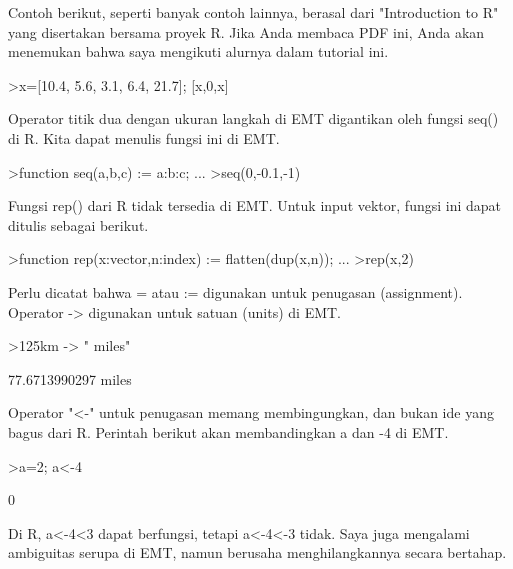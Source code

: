 \documentclass{article}
\newenvironment{eulernotebook}{\par}{\par}
\newenvironment{eulercomment}{\par\medskip}{\par\medskip}
\begin{document}
\begin{eulernotebook}
\begin{eulercomment}
\begin{eulercomment}
\begin{eulercomment}
\begin{eulercomment}
\begin{eulercomment}
Contoh berikut, seperti banyak contoh lainnya, berasal dari
"Introduction to R" yang disertakan bersama proyek R. Jika Anda
membaca PDF ini, Anda akan menemukan bahwa saya mengikuti alurnya
dalam tutorial ini.
\end{eulercomment}
\begin{eulerprompt}
>x=[10.4, 5.6, 3.1, 6.4, 21.7]; [x,0,x]
\end{eulerprompt}
\begin{euleroutput}
  [10.4,  5.6,  3.1,  6.4,  21.7,  0,  10.4,  5.6,  3.1,  6.4,  21.7]
\end{euleroutput}
\begin{eulercomment}
Operator titik dua dengan ukuran langkah di EMT digantikan oleh fungsi
seq() di R. Kita dapat menulis fungsi ini di EMT.
\end{eulercomment}
\begin{eulerprompt}
>function seq(a,b,c) := a:b:c; ...
>seq(0,-0.1,-1)
\end{eulerprompt}
\begin{euleroutput}
  [0,  -0.1,  -0.2,  -0.3,  -0.4,  -0.5,  -0.6,  -0.7,  -0.8,  -0.9,  -1]
\end{euleroutput}
\begin{eulercomment}
Fungsi rep() dari R tidak tersedia di EMT. Untuk input vektor, fungsi
ini dapat ditulis sebagai berikut.
\end{eulercomment}
\begin{eulerprompt}
>function rep(x:vector,n:index) := flatten(dup(x,n)); ...
>rep(x,2)
\end{eulerprompt}
\begin{euleroutput}
  [10.4,  5.6,  3.1,  6.4,  21.7,  10.4,  5.6,  3.1,  6.4,  21.7]
\end{euleroutput}
\begin{eulercomment}
Perlu dicatat bahwa = atau := digunakan untuk penugasan (assignment).
Operator -\textgreater{} digunakan untuk satuan (units) di EMT.
\end{eulercomment}
\begin{eulerprompt}
>125km -> " miles"
\end{eulerprompt}
\begin{euleroutput}
  77.6713990297 miles
\end{euleroutput}
\begin{eulercomment}
Operator "\textless{}-" untuk penugasan memang membingungkan, dan bukan ide yang
bagus dari R. Perintah berikut akan membandingkan a dan -4 di EMT.
\end{eulercomment}
\begin{eulerprompt}
>a=2; a<-4
\end{eulerprompt}
\begin{euleroutput}
  0
\end{euleroutput}
\begin{eulercomment}
Di R, a\textless{}-4\textless{}3 dapat berfungsi, tetapi a\textless{}-4\textless{}-3 tidak. Saya juga
mengalami ambiguitas serupa di EMT, namun berusaha menghilangkannya
secara bertahap.


\end{eulercomment}
\end{eulercomment}
\end{eulercomment}
\end{eulercomment}
\end{eulercomment}
\end{eulernotebook}
\end{document}
